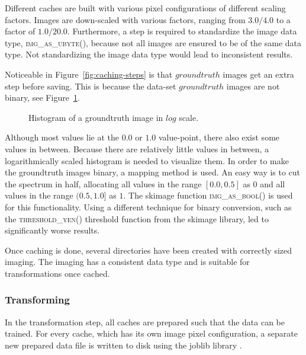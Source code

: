 Different caches are built with various pixel configurations of different scaling factors. Images are down-scaled with various factors, ranging from $3.0/4.0$ to a factor of $1.0/20.0$. Furthermore, a step is required to standardize the image data type, \textsc{img\_as\_ubyte()}, because not all images are ensured to be of the same data type. Not standardizing the image data type would lead to inconsistent results.

Noticeable in Figure~\ref{fig:caching-steps} is that $groundtruth$ images get an extra step before saving. This is because the data-set $groundtruth$ images are not binary, see Figure~\ref{fig:gt-histogram}.

\begin{figure}[ht]
  \centering
  
  \caption{Histogram of a groundtruth image in $log$ scale.
  }\label{fig:gt-histogram}
\end{figure}

Although most values lie at the $0.0$ or $1.0$ value-point, there also exist some values in between. Because there are relatively little values in between, a logarithmically scaled histogram is needed to visualize them. In order to make the groundtruth images binary, a mapping method is used. An easy way is to cut the spectrum in half, allocating all values in the range $[0.0, 0.5]$ as $0$ and all values in the range $(0.5, 1.0]$ as $1$. The skimage function \textsc{img\_as\_bool()} is used for this functionality. Using a different technique for binary conversion, such as the \textsc{threshold\_yen()} threshold function from the skimage library, led to significantly worse results.

Once caching is done, several directories have been created with correctly sized imaging. The imaging has a consistent data type and is suitable for transformations once cached.

\subsubsection{Transforming}
In the transformation step, all caches are prepared such that the data can be trained. For every cache, which has its own image pixel configuration, a separate new prepared data file is written to disk using the joblib library \citep{varoquaux2009joblib}.

